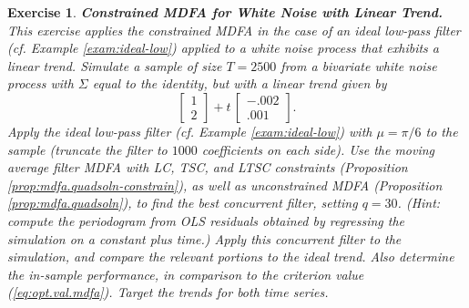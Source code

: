 \documentclass[a4paper]{book}
\newtheorem{Exercise}{Exercise}
\begin{document}
\begin{Exercise} {\bf  Constrained MDFA for White Noise with Linear Trend.} \rm
\label{exer:wntrend-mdfa}
This exercise applies the constrained MDFA in the case of an ideal low-pass filter
 (cf. Example \ref{exam:ideal-low}) 
 applied to a white noise process that exhibits a linear trend.
 Simulate a sample of size $T=2500$ from a
  bivariate white noise process with 
  $\Sigma$ equal to the identity, but with a linear trend  given by
  \[
   \left[ \begin{array}{c} 1 \\ 2 \end{array} \right] + t \, 
   \left[ \begin{array}{c} -.002 \\ .001 \end{array} \right].
  \]
   Apply the   ideal low-pass filter (cf. Example \ref{exam:ideal-low}) with 
  $\mu = \pi/6$ to the sample (truncate the filter to $1000$ coefficients on each side).  
 Use the moving average filter  MDFA  with LC, TSC, and LTSC constraints
  (Proposition \ref{prop:mdfa.quadsoln-constrain}),
  as well as unconstrained MDFA  (Proposition \ref{prop:mdfa.quadsoln}), to find the best
 concurrent filter, setting $q= 30$. 
  (Hint: compute the periodogram from OLS residuals obtained by regressing the simulation
   on a constant plus time.)
 Apply this concurrent filter 
 to the simulation, and compare the relevant portions to the ideal trend.
 Also determine the in-sample performance, in comparison to the criterion value
 (\ref{eq:opt.val.mdfa}).   Target the trends for both time series.
\end{Exercise}
\end{document}
